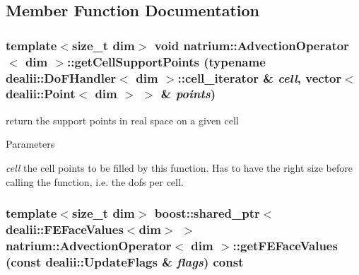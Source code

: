 \subsection{Member Function Documentation}
\hypertarget{classnatrium_1_1AdvectionOperator_a6891816bbe0a3f6be217f47a78cdcd79}{
\subsubsection[{getCellSupportPoints}]{\setlength{\rightskip}{0pt plus 5cm}template$<$size\_\-t dim$>$ void {\bf natrium::AdvectionOperator}$<$ dim $>$::getCellSupportPoints (typename dealii::DoFHandler$<$ dim $>$::cell\_\-iterator \& {\em cell}, \/  vector$<$ dealii::Point$<$ dim $>$ $>$ \& {\em points})}}
\label{classnatrium_1_1AdvectionOperator_a6891816bbe0a3f6be217f47a78cdcd79}


return the support points in real space on a given cell 
\begin{DoxyParams}{Parameters}
\item[{\em cell}]the cell  points to be filled by this function. Has to have the right size before calling the function, i.e. the dofs per cell. \end{DoxyParams}
\hypertarget{classnatrium_1_1AdvectionOperator_acf26df77fa01498ff8de55e6d4c51311}{
\subsubsection[{getFEFaceValues}]{\setlength{\rightskip}{0pt plus 5cm}template$<$size\_\-t dim$>$ boost::shared\_\-ptr$<$dealii::FEFaceValues$<$dim$>$ $>$ {\bf natrium::AdvectionOperator}$<$ dim $>$::getFEFaceValues (const dealii::UpdateFlags \& {\em flags}) const}}
\label{classnatrium_1_1AdvectionOperator_acf26df77fa01498ff8de55e6d4c51311}


